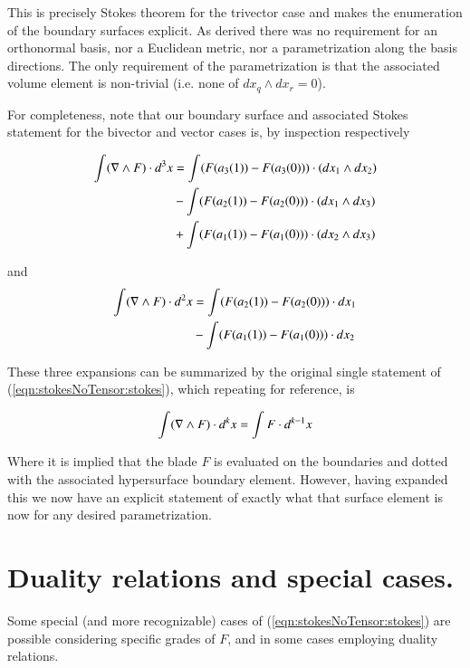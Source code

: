 This is precisely Stokes theorem for the trivector case and makes the enumeration of the boundary surfaces explicit.  As derived there was no requirement for an orthonormal basis, nor a Euclidean metric, nor a parametrization along the basis directions.  The only requirement of the parametrization is that the associated volume element is non-trivial (i.e. none of $dx_q \wedge dx_r = 0$).  %

For completeness, note that our boundary surface and associated Stokes statement for the bivector and vector cases is, by inspection respectively

\begin{align*}
\int ( \nabla \wedge F ) \cdot d^3 x 
&= \int (F(a_3(1)) - F(a_3(0))) \cdot ( dx_1 \wedge dx_2 ) \\
&- \int (F(a_2(1)) - F(a_2(0))) \cdot ( dx_1 \wedge dx_3 ) \\
&+ \int (F(a_1(1)) - F(a_1(0))) \cdot ( dx_2 \wedge dx_3 ) \\
\end{align*}

and
\begin{align*}
\int ( \nabla \wedge F ) \cdot d^2 x 
&= \int (F(a_2(1)) - F(a_2(0))) \cdot dx_1 \\
&- \int (F(a_1(1)) - F(a_1(0))) \cdot dx_2 \\
\end{align*}

These three expansions can be summarized by the original single statement of (\ref{eqn:stokesNoTensor:stokes}), which repeating for reference, is

\begin{align*}
\int ( \nabla \wedge F ) \cdot d^k x = \int F \cdot d^{k-1} x 
\end{align*}

Where it is implied that the blade $F$ is evaluated on the boundaries and dotted with the associated hypersurface boundary element.  However, having expanded this we now have an explicit statement of exactly what that surface element is now for any desired parametrization.

\section{Duality relations and special cases.}

Some special (and more recognizable) cases of (\ref{eqn:stokesNoTensor:stokes}) are possible considering specific grades of $F$, and in some cases employing duality relations.  

